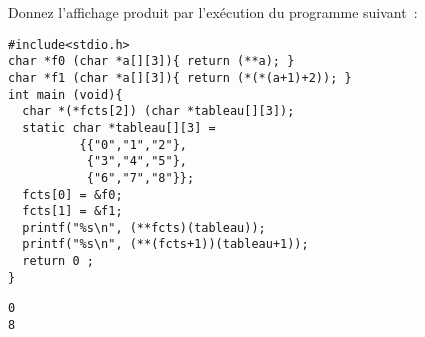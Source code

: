  Donnez l'affichage produit par l'ex\'ecution du programme
   suivant~:
\begin{verbatim}
#include<stdio.h>
char *f0 (char *a[][3]){ return (**a); }
char *f1 (char *a[][3]){ return (*(*(a+1)+2)); }
int main (void){
  char *(*fcts[2]) (char *tableau[][3]);
  static char *tableau[][3] =
          {{"0","1","2"},
           {"3","4","5"},
           {"6","7","8"}};
  fcts[0] = &f0;
  fcts[1] = &f1;
  printf("%s\n", (**fcts)(tableau));
  printf("%s\n", (**(fcts+1))(tableau+1));
  return 0 ;
}
\end{verbatim}
\ifcorrection
\begin{verbatim}
0
8 
\end{verbatim}
\fi
